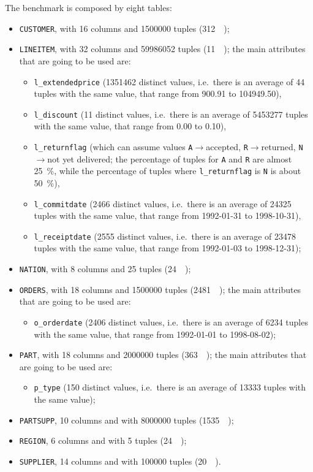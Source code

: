 The benchmark is composed by eight tables:
\begin{itemize}
	\item \texttt{CUSTOMER}, with \num{16} columns and \num{1500000} tuples (\SI{312}{\mega\byte});
	\item \texttt{LINEITEM}, with \num{32} columns and \num{59986052} tuples (\SI{11}{\giga\byte}); the main attributes that are going to be used are:
		\begin{itemize}
			\item \texttt{l\_extendedprice} (\num{1351462} distinct values, i.e.\ there is an average of \num{44} tuples with the same value, that range from \num{900.91} to \num{104949.50}),
			\item \texttt{l\_discount} (\num{11} distinct values, i.e.\ there is an average of \num{5453277} tuples with the same value, that range from \num{0.00} to \num{0.10}),
			\item \texttt{l\_returnflag} (which can assume values \texttt{A}$\rightarrow$accepted, \texttt{R}$\rightarrow$returned, \texttt{N}$\rightarrow$not yet delivered; the percentage of tuples for \texttt{A} and \texttt{R} are almost \SI{25}{\percent}, while the percentage of tuples where \texttt{l\_returnflag} is \texttt{N} is about \SI{50}{\percent}),
			\item \texttt{l\_commitdate} (\num{2466} distinct values, i.e.\ there is an average of \num{24325} tuples with the same value, that range from {1992-01-31} to {1998-10-31}),
			\item \texttt{l\_receiptdate} (\num{2555} distinct values, i.e.\ there is an average of \num{23478} tuples with the same value, that range from {1992-01-03} to {1998-12-31});
		\end{itemize}
	\item \texttt{NATION}, with \num{8} columns and \num{25} tuples (\SI{24}{\kilo\byte});
	\item \texttt{ORDERS}, with \num{18} columns and \num{1500000} tuples (\SI{2481}{\kilo\byte}); the main attributes that are going to be used are:
		\begin{itemize}
			\item \texttt{o\_orderdate} (\num{2406} distinct values, i.e.\ there is an average of \num{6234} tuples with the same value, that range from {1992-01-01} to {1998-08-02});
		\end{itemize}
	\item \texttt{PART}, with \num{18} columns and \num{2000000} tuples (\SI{363}{\mega\byte}); the main attributes that are going to be used are:
		\begin{itemize}
			\item \texttt{p\_type} (\num{150} distinct values, i.e.\ there is an average of \num{13333} tuples with the same value);
		\end{itemize}
	\item \texttt{PARTSUPP}, \num{10} columns and with \num{8000000} tuples (\SI{1535}{\mega\byte});
	\item \texttt{REGION}, \num{6} columns and with \num{5} tuples (\SI{24}{\kilo\byte});
	\item \texttt{SUPPLIER}, \num{14} columns and with \num{100000} tuples (\SI{20}{\mega\byte}).
\end{itemize}
